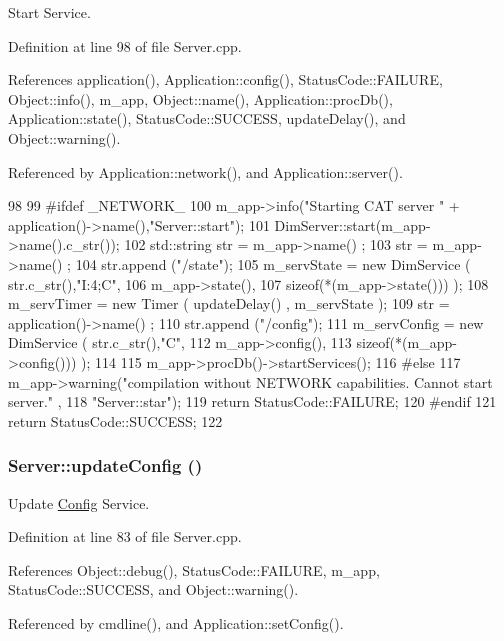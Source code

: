 Start Service. 

Definition at line 98 of file Server.cpp.

References application(), Application::config(), StatusCode::FAILURE, Object::info(), m\_\-app, Object::name(), Application::procDb(), Application::state(), StatusCode::SUCCESS, updateDelay(), and Object::warning().

Referenced by Application::network(), and Application::server().


\begin{DoxyCode}
98                            {
99 #ifdef _NETWORK_
100   m_app->info("Starting CAT server " + application()->name(),"Server::start");
101   DimServer::start(m_app->name().c_str());
102   std::string str =  m_app->name() ;
103   str = m_app->name() ;
104   str.append ("/state");
105   m_servState = new DimService ( str.c_str(),"I:4;C",
106                                  m_app->state(),
107                                  sizeof(*(m_app->state())) );
108   m_servTimer = new Timer    ( updateDelay() , m_servState );
109   str = application()->name() ;
110   str.append ("/config"); 
111   m_servConfig = new DimService ( str.c_str(),"C",
112                                   m_app->config(),
113                                   sizeof(*(m_app->config())) );
114 
115   m_app->procDb()->startServices();
116 #else
117   m_app->warning("compilation without NETWORK capabilities. Cannot start server."
      ,
118                  "Server::star");
119   return StatusCode::FAILURE;
120 #endif
121   return StatusCode::SUCCESS;
122 }
\end{DoxyCode}
\hypertarget{classServer_af58d60a5587813e2aab7fc9016dfa01a}{
\subsubsection[{updateConfig}]{ Server::updateConfig ()}}
\label{classServer_af58d60a5587813e2aab7fc9016dfa01a}


Update \hyperlink{classConfig}{Config} Service. 

Definition at line 83 of file Server.cpp.

References Object::debug(), StatusCode::FAILURE, m\_\-app, StatusCode::SUCCESS, and Object::warning().

Referenced by cmdline(), and Application::setConfig().


